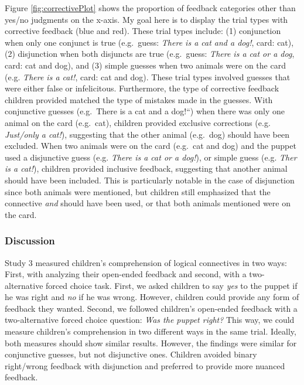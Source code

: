 \documentclass[floatsintext,man]{apa6}
\theoremstyle{definition}
\theoremstyle{definition}
\theoremstyle{definition}
\theoremstyle{remark}
\begin{document}
Figure \ref{fig:correctivePlot} shows the proportion of feedback
categories other than yes/no judgments on the x-axis. My goal here is to
display the trial types with corrective feedback (blue and red). These
trial types include: (1) conjunction when only one conjunct is true
(e.g.~guess: \emph{There is a cat and a dog!}, card: cat), (2)
disjunction when both disjuncts are true (e.g.~guess: \emph{There is a
cat or a dog}, card: cat and dog), and (3) simple guesses when two
animals were on the card (e.g. \emph{There is a cat!}, card: cat and
dog). These trial types involved guesses that were either false or
infelicitous. Furthermore, the type of corrective feedback children
provided matched the type of mistakes made in the guesses. With
conjunctive guesses (e.g.~There is a cat and a dog!``) when there was
only one animal on the card (e.g.~cat), children provided exclusive
corrections (e.g. \emph{Just/only a cat!}), suggesting that the other
animal (e.g.~dog) should have been excluded. When two animals were on
the card (e.g.~cat and dog) and the puppet used a disjunctive guess
(e.g. \emph{There is a cat or a dog!}), or simple guess (e.g. \emph{Ther
is a cat!}), children provided inclusive feedback, suggesting that
another animal should have been included. This is particularly notable
in the case of disjunction since both animals were mentioned, but
children still emphasized that the connective \emph{and} should have
been used, or that both animals mentioned were on the card.

\subsubsection{Discussion}\label{discussion-2}

Study 3 measured children's comprehension of logical connectives in two
ways: First, with analyzing their open-ended feedback and second, with a
two-alternative forced choice task. First, we asked children to say
\emph{yes} to the puppet if he was right and \emph{no} if he was wrong.
However, children could provide any form of feedback they wanted.
Second, we followed children's open-ended feedback with a
two-alternative forced choice question: \emph{Was the puppet right?}
This way, we could measure children's comprehension in two different
ways in the same trial. Ideally, both measures should show similar
results. However, the findings were similar for conjunctive guesses, but
not disjunctive ones. Children avoided binary right/wrong feedback with
disjunction and preferred to provide more nuanced feedback.
\end{document}
